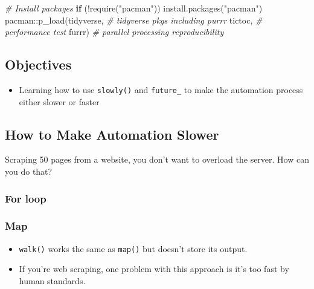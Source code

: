 \documentclass[
]{book}
\newenvironment{Shaded}{\begin{snugshade}}{\end{snugshade}}
\newcommand{\CommentTok}[1]{\textcolor[rgb]{0.56,0.35,0.01}{\textit{#1}}}
\newcommand{\ControlFlowTok}[1]{\textcolor[rgb]{0.13,0.29,0.53}{\textbf{#1}}}
\newcommand{\FunctionTok}[1]{\textcolor[rgb]{0.00,0.00,0.00}{#1}}
\newcommand{\NormalTok}[1]{#1}
\newcommand{\SpecialCharTok}[1]{\textcolor[rgb]{0.00,0.00,0.00}{#1}}
\newcommand{\StringTok}[1]{\textcolor[rgb]{0.31,0.60,0.02}{#1}}
\providecommand{\tightlist}{%
  \setlength{\itemsep}{0pt}\setlength{\parskip}{0pt}}
\begin{document}
\begin{Shaded}
\begin{Highlighting}[]
\CommentTok{\# Install packages }
\ControlFlowTok{if}\NormalTok{ (}\SpecialCharTok{!}\FunctionTok{require}\NormalTok{(}\StringTok{"pacman"}\NormalTok{)) }\FunctionTok{install.packages}\NormalTok{(}\StringTok{"pacman"}\NormalTok{)}
\NormalTok{pacman}\SpecialCharTok{::}\FunctionTok{p\_load}\NormalTok{(tidyverse, }\CommentTok{\# tidyverse pkgs including purrr}
\NormalTok{               tictoc, }\CommentTok{\# performance test }
\NormalTok{               furrr) }\CommentTok{\# parallel processing  reproducibility }
\end{Highlighting}
\end{Shaded}

\hypertarget{objectives-3}{%
\subsection{Objectives}\label{objectives-3}}

\begin{itemize}
\tightlist
\item
  Learning how to use \texttt{slowly()} and \texttt{future\_} to make the automation process either slower or faster
\end{itemize}

\hypertarget{how-to-make-automation-slower}{%
\subsection{How to Make Automation Slower}\label{how-to-make-automation-slower}}

Scraping 50 pages from a website, you don't want to overload the server. How can you do that?

\hypertarget{for-loop-2}{%
\subsubsection{For loop}\label{for-loop-2}}

\hypertarget{map}{%
\subsubsection{Map}\label{map}}

\begin{itemize}
\item
  \texttt{walk()} works the same as \texttt{map()} but doesn't store its output.
\item
  If you're web scraping, one problem with this approach is it's too fast by human standards.
\end{itemize}
\end{document}
